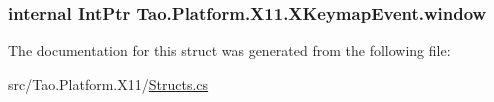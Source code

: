 \label{struct_tao_1_1_platform_1_1_x11_1_1_x_keymap_event_aea848f6774856c843b11a251a97265b5}
\hypertarget{struct_tao_1_1_platform_1_1_x11_1_1_x_keymap_event_a891a61e347fba5f8f80a00b9a5aad858}{
\subsubsection[{window}]{\setlength{\rightskip}{0pt plus 5cm}internal IntPtr {\bf Tao.Platform.X11.XKeymapEvent.window}}}
\label{struct_tao_1_1_platform_1_1_x11_1_1_x_keymap_event_a891a61e347fba5f8f80a00b9a5aad858}


The documentation for this struct was generated from the following file:\begin{DoxyCompactItemize}
\item 
src/Tao.Platform.X11/\hyperlink{_structs_8cs}{Structs.cs}\end{DoxyCompactItemize}
